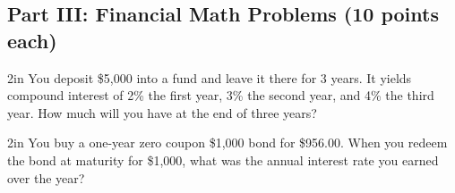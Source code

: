 \documentclass[12pt]{exam}
\begin{document}
\begin{questions}
	\section*{Part III: Financial Math Problems (10 points each)}
	
	
	\begin{problem}[10]{2in}
	You deposit \$5,000 into a fund and leave it there for 3 years.  It yields compound 
	interest of 2\% the first year,
	3\% the second year,
	and 4\% the third year.  How much will you have at the end of three years?
	\end{problem}
	
	\begin{problem}[10]{2in}
	You buy a one-year zero coupon \$1,000 bond for \$956.00.  When you redeem the bond
	at maturity for \$1,000, what was the annual interest rate you earned over the year?
	\end{problem}
	

\end{questions}
\end{document}
